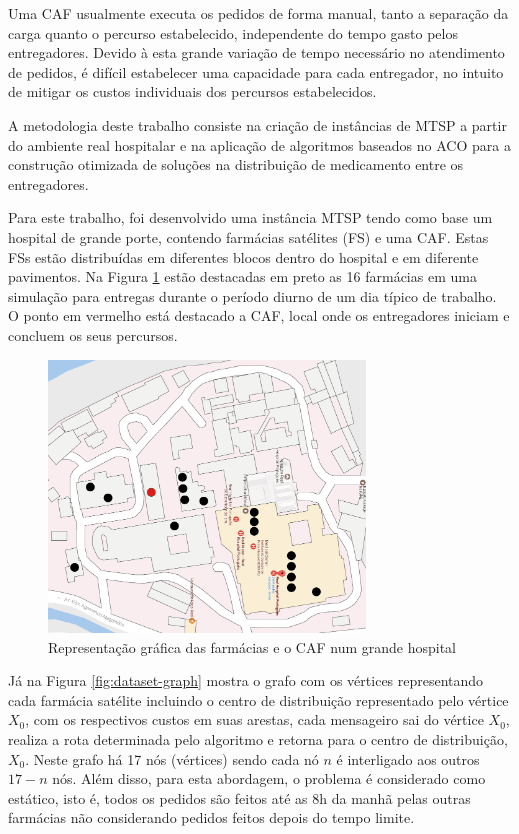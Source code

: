 Uma CAF usualmente executa os pedidos de forma manual, tanto a separação da carga quanto o percurso estabelecido, independente do tempo gasto pelos entregadores. Devido à esta grande variação de tempo necessário no atendimento de pedidos, é difícil estabelecer uma capacidade para cada entregador, no intuito de mitigar os custos individuais dos percursos estabelecidos.

A metodologia deste trabalho consiste na criação de instâncias de MTSP a partir do ambiente real hospitalar e na aplicação de algoritmos baseados no ACO para a construção otimizada de soluções na distribuição de medicamento entre os entregadores.

Para este trabalho, foi desenvolvido uma instância MTSP tendo como base um hospital de grande porte, contendo farmácias satélites (FS) e uma CAF. Estas FSs estão distribuídas em diferentes blocos dentro do hospital e em diferente pavimentos. Na Figura \ref{fig:dataset-map} estão destacadas em preto as 16 farmácias em uma simulação para entregas durante o período diurno de um dia típico de trabalho. O ponto em vermelho está destacado a CAF, local onde os entregadores iniciam e concluem os seus percursos.

\begin{figure}[htb]
    \centering
    \includegraphics[width=0.75\textwidth]{imagens/dataset-map.png}
    \caption{Representação gráfica das farmácias e o CAF num grande hospital} \label{fig:dataset-map}
\end{figure}

Já na Figura \ref{fig:dataset-graph} mostra o grafo com os vértices representando cada farmácia satélite incluindo o centro de distribuição representado pelo vértice $X_0$, com os respectivos custos em suas arestas, cada mensageiro sai do vértice $X_0$, realiza a rota determinada pelo algoritmo e retorna para o centro de distribuição, $X_0$. Neste grafo há 17 nós (vértices) sendo cada nó $n$ é interligado aos outros $17 - n$ nós. Além disso, para esta abordagem, o problema é considerado como estático, isto é, todos os pedidos são feitos até as 8h da manhã pelas outras farmácias não considerando pedidos feitos depois do tempo limite.

